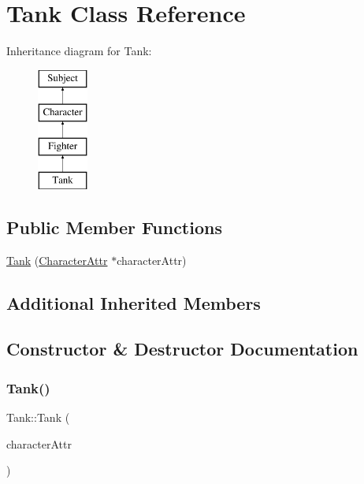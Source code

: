 \hypertarget{class_tank}{}\section{Tank Class Reference}
\label{class_tank}
Inheritance diagram for Tank\+:\begin{figure}[H]
\begin{center}
\leavevmode
\includegraphics[height=4.000000cm]{class_tank}
\end{center}
\end{figure}
\subsection*{Public Member Functions}
\begin{DoxyCompactItemize}
\item 
\hyperlink{class_tank_a15c93c302a1efff5c6bfdf8218b33da1}{Tank} (\hyperlink{class_character_attr}{Character\+Attr} $\ast$character\+Attr)
\end{DoxyCompactItemize}
\subsection*{Additional Inherited Members}


\subsection{Constructor \& Destructor Documentation}
\hypertarget{class_tank_a15c93c302a1efff5c6bfdf8218b33da1}{}\label{class_tank_a15c93c302a1efff5c6bfdf8218b33da1} 
\subsubsection{\texorpdfstring{Tank()}{Tank()}}
{\footnotesize\ttfamily Tank\+::\+Tank (\begin{DoxyParamCaption}\item[{\hyperlink{class_character_attr}{Character\+Attr} $\ast$}]{character\+Attr }\end{DoxyParamCaption})}

